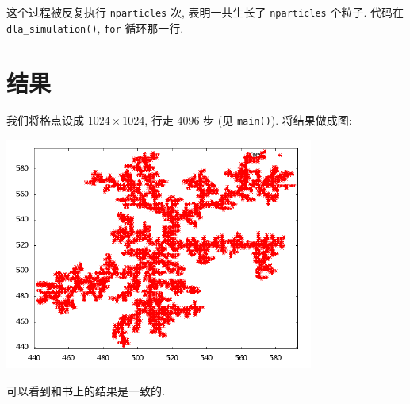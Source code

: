 \documentclass{ctexart}
\begin{document}
这个过程被反复执行 \verb|nparticles| 次, 表明一共生长了
\verb|nparticles| 个粒子. 代码在 \verb|dla_simulation()|,
\verb|for| 循环那一行.

\section{结果}
我们将格点设成 $1024\times1024$, 行走 4096 步 (见 \verb|main()|).
将结果做成图:
\begin{center}
\includegraphics[width=4in]{res.png}
\end{center}
可以看到和书上的结果是一致的.
\end{document}
